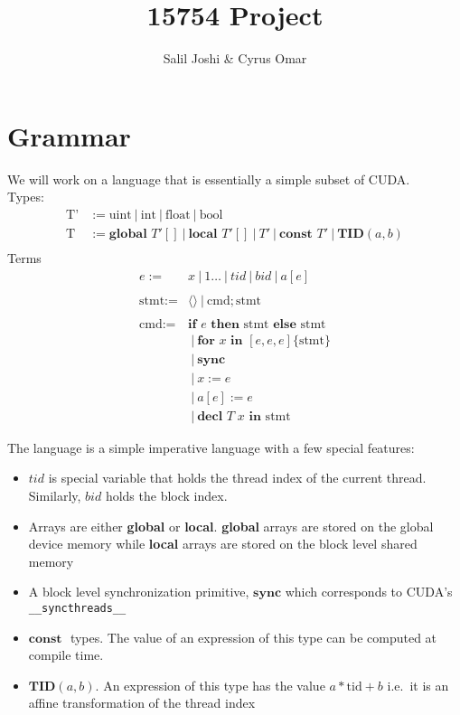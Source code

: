 \documentclass{article}
\title{15754 Project}
\author{Salil Joshi \& Cyrus Omar}
\newcommand{\nil}{\langle\rangle}
\newcommand{\Global}{\textbf{global }}
\newcommand{\local}{\textbf{local }}
\newcommand{\const}{\textbf{const }}
\newcommand{\tid}[2]{\textbf{TID}(#1, #2)}
\newcommand{\Ifte}[3]{\textbf{if } #1 \textbf{ then } #2 \textbf{ else } #3}
\newcommand{\for}[5]{\textbf{for } #1 \textbf{ in } [#2, #3, #4] \{#5\}}
\newcommand{\sync}{\textbf{sync}}
\newcommand{\decl}[3]{\textbf{decl } #1\; #2 \textbf{ in } #3}
\renewcommand{\|}{\:|\:}
\begin{document}
\maketitle
\section{Grammar}
We will work on a language that is essentially a simple subset of CUDA.\\
Types:
  \begin{align*}
    \text{T'} &:=  \text{uint} \| \text{int} \| \text{float} \| \text{bool} \\
    \text{T} &:= \Global T' [] \| \local T' [] \| T' \| \const T' \| \tid{a}{b} \\
  \end{align*}
Terms
  \begin{align*}
    e := & x \| 1\ldots \| tid \| bid \| a[e] \\
     & \\
    \text{stmt} := & \nil \| \text{cmd}; \text{stmt}\\
     & \\
    \text{cmd} := & \Ifte{e}{\text{stmt}}{\text{stmt}} \\
                  & \| \for{x}{e}{e}{e}{\text{stmt}} \\
                  & \| \sync \\
                  & \| x := e \\
                  & \| a[e] := e \\
                  & \| \decl{T}{x}{\text{stmt}}
  \end{align*}

The language is a simple imperative language with a few special features:
\begin{itemize}
  \item $tid$ is special variable that holds the thread index of the current thread. Similarly, $bid$ holds the block index.
  \item Arrays are either \textbf{global} or \textbf{local}. \textbf{global} arrays are stored on the global device memory while \textbf{local} arrays are stored on the block level shared memory
  \item A block level synchronization primitive, $\sync$ which corresponds to CUDA's \texttt{\_\_syncthreads\_\_}
  \item $\const$ types. The value of an expression of this type can be computed at compile time.
  \item $\tid{a}{b}$. An expression of this type has the value $a*\text{tid} + b$ i.e.\ it is an affine transformation of the thread index
\end{itemize}
\end{document}
